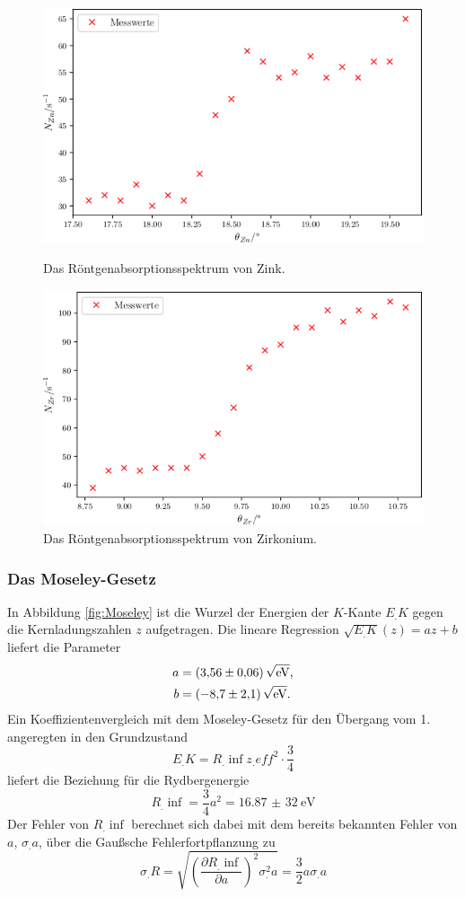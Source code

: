 \begin{figure}
\centering
\includegraphics[width=\linewidth-70pt,height=\textheight-70pt,keepaspectratio]{content/images/Zn.png}
\caption{Das Röntgenabsorptionsspektrum von Zink.}
\label{fig:Zn}

\includegraphics[width=\linewidth-70pt,height=\textheight-70pt,keepaspectratio]{content/images/Zr.png}
\caption{Das Röntgenabsorptionsspektrum von Zirkonium.}
\label{fig:Zr}
\end{figure}

\subsubsection{Das Moseley-Gesetz}
In Abbildung \ref{fig:Moseley} ist die Wurzel der Energien der $K$-Kante $E_.K$ gegen die Kernladungszahlen $z$ aufgetragen. Die lineare Regression $\sqrt{E_.K}(z)=az+b$ liefert die Parameter
\begin{align*}
a&=\SI{3,56(6)}{\sqrt{\eV}}\text{,}\\
b&=\SI{-8,7(21)}{\sqrt{\eV}}\text{.}
\end{align*}
Ein Koeffizientenvergleich mit dem Moseley-Gesetz für den Übergang vom 1. angeregten in den Grundzustand
\[
E_.K = R_.{\inf}z_.{eff}^2\cdot\frac{3}{4}
\]
liefert die Beziehung für die Rydbergenergie
\[
R_.{\inf}=\frac{3}{4}a^2=\SI{16,87(32)}{\eV}
\]
Der Fehler von $R_.{\inf}$ berechnet sich dabei mit dem bereits bekannten Fehler von $a$, $\sigma_.a$, über die Gaußsche Fehlerfortpflanzung zu
\[
\sigma_.R=\sqrt{\left(\frac{\partial R_.{\inf}}{\partial a}\right)^2\sigma^2_.a}=\frac{3}{2}a\sigma_.a
\]

